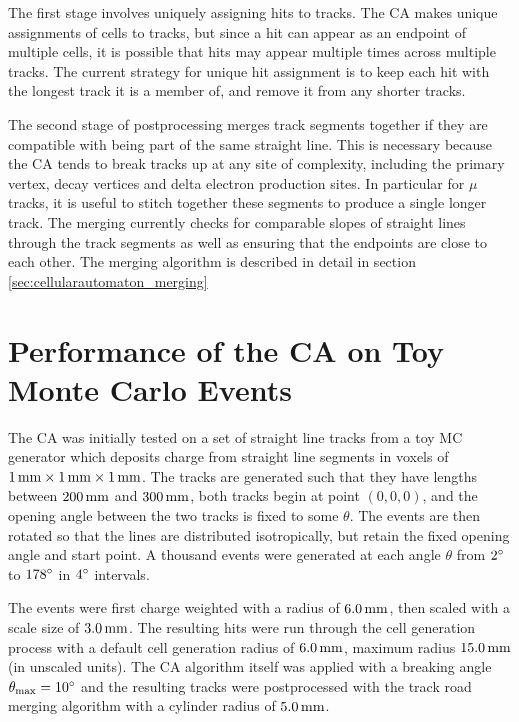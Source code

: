 The first stage involves uniquely assigning hits to tracks. The \ac{CA} makes unique assignments of cells to tracks, but since a hit can appear as an endpoint of multiple cells, it is possible that hits may appear multiple times across multiple tracks. The current strategy for unique hit assignment is to keep each hit with the longest track it is a member of, and remove it from any shorter tracks.

The second stage of postprocessing merges track segments together if they are compatible with being part of the same straight line. This is necessary because the CA tends to break tracks up at any site of complexity, including the primary vertex, decay vertices and delta electron production sites. In particular for $\mu$ tracks, it is useful to stitch together these segments to produce a single longer track. The merging currently checks for comparable slopes of straight lines through the track segments as well as ensuring that the endpoints are close to each other. The merging algorithm is described in detail in section \ref{sec:cellularautomaton_merging}

\section{Performance of the \acl{CA} on Toy Monte Carlo Events}\label{sec:ca-toy-tracks}
The \ac{CA} was initially tested on a set of straight line tracks from a toy \ac{MC} generator which deposits charge from straight line segments in voxels of $1\,\mathrm{mm}\times1\,\mathrm{mm}\times1\,\mathrm{mm}$. The tracks are generated such that they have lengths between $200\,\mathrm{mm}$ and $300\,\mathrm{mm}$, both tracks begin at point $(0, 0, 0)$, and the opening angle between the two tracks is fixed to some $\theta$. The events are then rotated so that the lines are distributed isotropically, but retain the fixed opening angle and start point. A thousand events were generated at each angle $\theta$ from $2^\circ$ to $178^\circ$ in $4^\circ$ intervals.

The events were first charge weighted with a radius of $6.0\,\mathrm{mm}$, then scaled with a scale size of $3.0\,\mathrm{mm}$. The resulting hits were run through the cell generation process with a default cell generation radius of $6.0\,\mathrm{mm}$, maximum radius $15.0\,\mathrm{mm}$ (in unscaled units). The \ac{CA} algorithm itself was applied with a breaking angle $\theta_\mathrm{max} = 10^\circ$ and the resulting tracks were postprocessed with the track road merging algorithm with a cylinder radius of $5.0\,\mathrm{mm}$.

